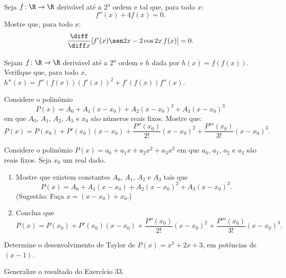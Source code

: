 \begin{exercicio}[30]
\label{ex:7.17.30}
Seja $f\colon \R \to \R$ derivável até a 2\textsuperscript{a} ordem e tal que, para todo $x$:
\[
f''(x) + 4f(x) = 0.
\]
Mostre que, para todo $x$:
\[
\frac{\diff}{\diff x}[f'(x)\sen 2x - 2\cos 2x\,f(x)] = 0.
\]
\end{exercicio}

\begin{exercicio}[31]
\label{ex:7.17.31}
Sejam $f\colon \R \to \R$ derivável até a 2\textsuperscript{a} ordem e $h$ dada por $h(x) = f(f(x))$. Verifique que, para todo $x$, $h''(x) = f''(f(x))(f'(x))^2 + f'(f(x))f''(x)$.
\end{exercicio}

\begin{exercicio}[32]
\label{ex:7.17.32}
Considere o polinômio
\[
P(x) = A_0 + A_1 (x - x_0) + A_2 (x - x_0)^2 + A_3 (x - x_0)^3
\]
em que $A_0$, $A_1$, $A_2$, $A_3$ e $x_0$ são números reais fixos. Mostre que:
\[
P(x) = P(x_0) + P'(x_0)(x - x_0) + \dfrac{P''(x_0)}{2!}(x - x_0)^2 + \dfrac{P'''(x_0)}{3!}(x - x_0)^3.
\]
\end{exercicio}

\begin{exercicio}[33]
\label{ex:7.17.33}
Considere o polinômio $P(x) = a_0 + a_1 x + a_2 x^2 + a_3 x^3$ em que $a_0$, $a_1$, $a_2$ e $a_3$ são reais fixos. Seja $x_0$ um real dado.
\begin{enumerate}[label=\alph*)]
    \item Mostre que existem constantes $A_0$, $A_1$, $A_2$ e $A_3$ tais que
    \[
    P(x) = A_0 + A_1 (x - x_0) + A_2 (x - x_0)^2 + A_3 (x - x_0)^3.
    \]
    (Sugestão: Faça $x = (x - x_0) + x_0$.)
    \item Conclua que
    \[
    P(x) = P(x_0) + P'(x_0)(x - x_0) + \dfrac{P''(x_0)}{2!}(x - x_0)^2 + \dfrac{P'''(x_0)}{3!}(x - x_0)^3.
    \]
\end{enumerate}
\end{exercicio}

\begin{exercicio}[34]
\label{ex:7.17.34}
Determine o desenvolvimento de Taylor de $P(x) = x^3 + 2x + 3$, em potências de $(x - 1)$.
\end{exercicio}

\begin{exercicio}[35]
\label{ex:7.17.35}
Generalize o resultado do Exercício 33.
\end{exercicio}

